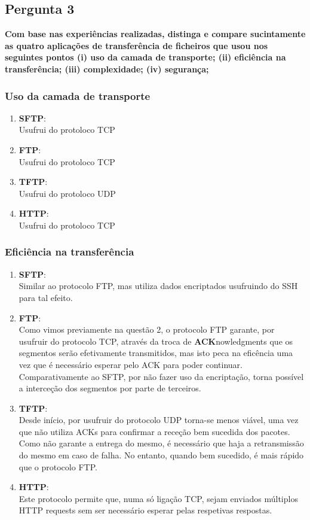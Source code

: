 \documentclass[11pt]{article}
\begin{document}
\subsection{Pergunta 3}

\textbf{Com base nas experiências realizadas, distinga e compare sucintamente as quatro aplicações de transferência de ficheiros que usou nos seguintes pontos (i) uso da camada de transporte; (ii) eficiência na transferência; (iii) complexidade; (iv) segurança;}

\subsubsection{Uso da camada de transporte}
\begin{enumerate}
  \item \textbf{SFTP}:\\
  Usufrui do protoloco TCP
  \item \textbf{FTP}:\\
  Usufrui do protoloco TCP
  \item \textbf{TFTP}:\\
  Usufrui do protoloco UDP
  \item \textbf{HTTP}:\\
  Usufrui do protoloco TCP
\end{enumerate}

\subsubsection{Eficiência na transferência}
\begin{enumerate}
  \item \textbf{SFTP}:\\
  Similar ao protocolo FTP, mas utiliza dados encriptados usufruindo do SSH para tal efeito.
  \item \textbf{FTP}:\\
  Como vimos previamente na questão 2, o protocolo FTP garante, por usufruir do protocolo TCP, através da troca de \textbf{ACK}nowledgments que os segmentos serão efetivamente transmitidos, mas isto peca na eficência uma vez que é necessário esperar pelo ACK para poder continuar. Comparativamente ao SFTP, por não fazer uso da encriptação, torna possível a interceção dos segmentos por parte de terceiros.
  \item \textbf{TFTP}:\\
  Desde início, por usufruir do protocolo UDP torna-se menos viável, uma vez que não utiliza ACKs para confirmar a receção bem sucedida dos pacotes. Como não garante a entrega do mesmo, é necessário que haja a retransmissão do mesmo em caso de falha. No entanto, quando bem sucedido, é mais rápido que o protocolo FTP.
  \item \textbf{HTTP}:\\
  Este protocolo permite que, numa só ligação TCP, sejam enviados múltiplos HTTP requests
  sem ser necessário esperar pelas respetivas respostas.
\end{enumerate}
\end{document}
